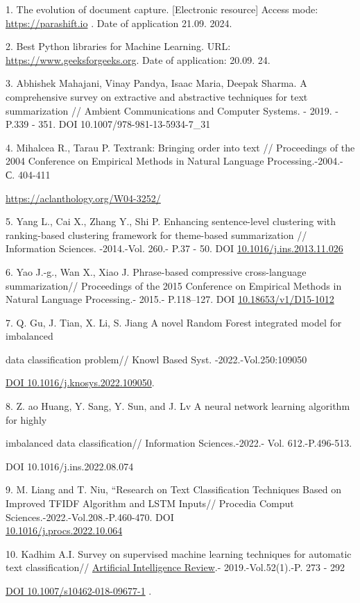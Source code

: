 \begin{references}
1. The evolution of document capture. {[}Electronic resource{]} Access
mode:
\href{https://parashift.io/the-evolution-of-document-capture\%20/}{https://parashift.io} . Date of application 21.09. 2024.

2. Best Python libraries for Machine Learning. URL:
\href{https://www.geeksforgeeks.org/best-python-libraries-for-machine-learning/}{https://www.geeksforgeeks.org}.
Date of application: 20.09. 24.

3. Abhishek Mahajani, Vinay Pandya, Isaac Maria, Deepak Sharma. A
comprehensive survey on extractive and abstractive techniques for text
summarization // Ambient Communications and Computer Systems. - 2019. -
P.339 - 351. DOI 10.1007/978-981-13-5934-7\_31

4. Mihalcea R., Tarau P. Textrank: Bringing order into text //
Proceedings of the 2004 Conference on Empirical Methods in Natural
Language Processing.-2004.- С. 404-411

\url{https://aclanthology.org/W04-3252/}

5. Yang L., Cai X., Zhang Y., Shi P. Enhancing sentence-level clustering
with ranking-based clustering framework for theme-based summarization //
Information Sciences. -2014.-Vol. 260.- P.37 - 50. DOI
\href{http://dx.doi.org/10.1016/j.ins.2013.11.026}{10.1016/j.ins.2013.11.026}

6. Yao J.-g., Wan X., Xiao J. Phrase-based compressive cross-language
summarization// Proceedings of the 2015 Conference on Empirical Methods
in Natural Language Processing.- 2015.- P.118--127. DOI
\href{http://dx.doi.org/10.18653/v1/D15-1012}{10.18653/v1/D15-1012}

7. Q. Gu, J. Tian, X. Li, S. Jiang A novel Random Forest integrated
model for imbalanced

data classification problem// Knowl Based Syst. -2022.-Vol.250:109050

\href{https://doi.org/10.1016/j.knosys.2022.109050}{DOI
10.1016/j.knosys.2022.109050}.

8. Z. ao Huang, Y. Sang, Y. Sun, and J. Lv A neural network learning
algorithm for highly

imbalanced data classification// Information Sciences.-2022.- Vol.
612.-P.496-513.

DOI 10.1016/j.ins.2022.08.074

9. M. Liang and T. Niu, ``Research on Text Classification Techniques
Based on Improved TFIDF Algorithm and LSTM Inputs// Procedia Comput
Sciences.-2022.-Vol.208.-P.460-470. DOI\\
\href{https://doi.org/10.1016/j.procs.2022.10.064}{10.1016/j.procs.2022.10.064}

10. Kadhim A.I. Survey on supervised machine learning techniques for
automatic text classification//
\href{https://www.researchgate.net/journal/Artificial-Intelligence-Review-1573-7462?_tp=eyJjb250ZXh0Ijp7ImZpcnN0UGFnZSI6InB1YmxpY2F0aW9uIiwicGFnZSI6InB1YmxpY2F0aW9uIn19}{Artificial
Intelligence Review}.- 2019.-Vol.52(1).-P. 273 - 292

\href{https://doi.org/10.1007/s10462-018-09677-1}{DOI
10.1007/s10462-018-09677-1} .
\end{references}

